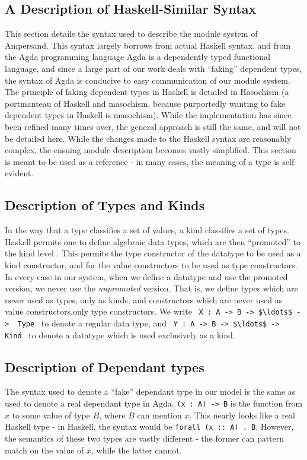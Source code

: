 \noindent
\subsection{A Description of Haskell-Similar Syntax}\label{subsec:HaskellSyntax}

This section details the syntax used to describe the module system of
Ampersand. This syntax largely borrows from actual Haskell syntax, and from the
Agda programming language%
 Agda is a dependently typed functional
language, and since a large part of our work deals with ``faking'' dependent
types, the syntax of Agda is conducive to easy communication of our module 
system. The
principle of faking dependent types in Haskell is detailed in
Hasochism \citep{hasochism} 
(a portmanteau of Haskell and masochism, because
purportedly wanting to fake dependent types in Haskell is masochism). While the
implementation has since been refined many times over, the general approach is 
still the
same, and will not be detailed here.
While the changes made to the Haskell syntax are reasonably complex, the 
ensuing 
module description becomes vastly simplified. This section is meant to be used
as a reference - in many cases, the meaning of a type is self-evident. 

\noindent
\subsection{Description of Types and Kinds}
In the way that a type classifies a set of values, a kind classifies a set of
types. Haskell permits one to define algebraic data types, which are then 
``promoted''
to the kind level \citep{promotion}. 
This permits the type constructor of the datatype to be used
as a kind constructor, and for the value constructors to be used as type 
constructors. In every case in our system, when we define a datatype and use 
the promoted version, we never use the \emph{unpromoted} version. That is, we 
define types which are never used as types, only as kinds, and constructors 
which are never used as value constructors,only type constructors. We write 
\,\,\,\lstinline!X : A -> B -> $\ldots$ -> 
Type!\,\,\, to denote
a regular data type, and \,\,\,\lstinline!Y : A -> B -> $\ldots$ -> Kind!\,\,\, 
to denote a datatype
which is used exclusively as a kind. 

\noindent
\subsection{Description of Dependant types}
The syntax used to denote a ``fake'' dependant type in our model is the same 
as used to denote a real dependant type in Agda. \lstinline!(x : A) -> B! is 
the function
from $x$ to some value of type $B$, where $B$ can mention $x$. This nearly 
looks like a 
real Haskell type - in Haskell, the syntax would be \texttt{forall (x :: A) . 
B}. However, 
the semantics of these two types are vastly different - the former can pattern 
match
on the value of $x$, while the latter cannot. 

